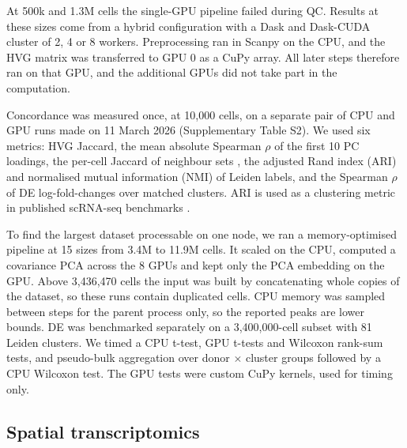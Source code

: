 \documentclass[runningheads]{llncs}
\begin{document}
At 500k and 1.3M cells the single-GPU pipeline failed during QC.
Results at these sizes come from a hybrid configuration with a Dask \cite{Rocklin2015} and Dask-CUDA \cite{RAPIDS2024} cluster of 2, 4 or 8 workers.
Preprocessing ran in Scanpy on the CPU, and the HVG matrix was transferred to GPU 0 as a CuPy array.
All later steps therefore ran on that GPU, and the additional GPUs did not take part in the computation.

Concordance was measured once, at 10,000 cells, on a separate pair of CPU and GPU runs made on 11 March 2026 (Supplementary Table S2).
We used six metrics: HVG Jaccard, the mean absolute Spearman $\rho$ of the first 10 PC loadings, the per-cell Jaccard of neighbour sets \cite{Gardner2025}, the adjusted Rand index (ARI) \cite{Hubert1985} and normalised mutual information (NMI) \cite{Vinh2010} of Leiden labels, and the Spearman $\rho$ of DE log-fold-changes over matched clusters.
ARI is used as a clustering metric in published scRNA-seq benchmarks \cite{Tian2019,Duo2020,Luecken2022}.

To find the largest dataset processable on one node, we ran a memory-optimised pipeline at 15 sizes from 3.4M to 11.9M cells.
It scaled on the CPU, computed a covariance PCA across the 8 GPUs and kept only the PCA embedding on the GPU.
Above 3,436,470 cells the input was built by concatenating whole copies of the dataset, so these runs contain duplicated cells.
CPU memory was sampled between steps for the parent process only, so the reported peaks are lower bounds.
DE was benchmarked separately on a 3,400,000-cell subset with 81 Leiden clusters.
We timed a CPU t-test, GPU t-tests and Wilcoxon rank-sum tests, and pseudo-bulk aggregation over donor $\times$ cluster groups followed by a CPU Wilcoxon test.
The GPU tests were custom CuPy kernels, used for timing only.

\hypertarget{spatial-transcriptomics}{%
\subsection{Spatial transcriptomics}\label{spatial-transcriptomics}}
\end{document}
